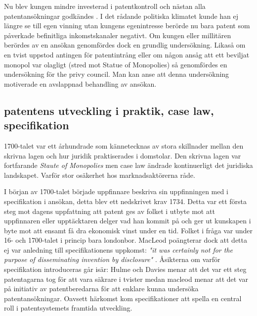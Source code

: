 Nu blev kungen mindre investerad i patentkontroll och nästan alla
patentansökningar godkändes \cite{bracha}. I det rådande politiska klimatet kunde han ej längre se till
egen vinning utan kungens egenintresse berörde nu bara patent som påverkade befinitliga inkomstskanaler
negativt\cite{macleod2}. Om kungen eller millitären berördes av en ansökan genomfördes dock en grundlig
undersökning. Likaså om en tvist uppstod antingen för patentintrång eller om någon ansåg att ett beviljat
monopol var olagligt (stred mot Statue of Monopolies) så genomfördes en undersökning för the privy
council\cite{bracha}. Man kan anse att denna undersökning motiverade en avslappnad behandling av ansökan.

\subsection{patentens utveckling i praktik, case law, specifikation}

1700-talet var ett århundrade som kännetecknas av stora skillnader mellan den skrivna lagen och hur juridik praktiserades i domstolar. Den skrivna lagen var fortfarande \emph{Staute of Monopolies} men case law ändrade kontinuerligt det juridiska landskapet. Varför stor osäkerhet hos marknadsaktörerna råde.

I början av 1700-talet började uppfinnare beskriva sin uppfinningen med i specifikation i ansökan, detta blev ett nedskrivet krav 1734\cite{macleod}. 
Detta var ett första steg mot dagens uppfattning att patent ges av folket i utbyte mot att uppfinnaren eller
upptäcktaren delger vad han kommit på och ger ut kunskapen i byte mot att ensamt få dra ekonomisk vinst
under en tid. Folket i fråga var under 16- och 1700-talet i princip bara londonbor. MacLeod poängterar dock att detta ej var anledning till specifikationens uppkomst: \emph{"it was certainly not for the purpose of disseminating invention by disclosure"} \cite{macleod2}. Åsikterna om varför specifikation introduceras går isär: Hulme och Davies menar att det var ett steg patentagarna tog för att vara säkrare i tvister medan macleod menar att det var på initiativ av patentberedarna för att enklare kunna undersöka patentansökningar. Oavsett härkomst kom specifikationer att spella en central roll i patentsystemets framtida utveckling.


